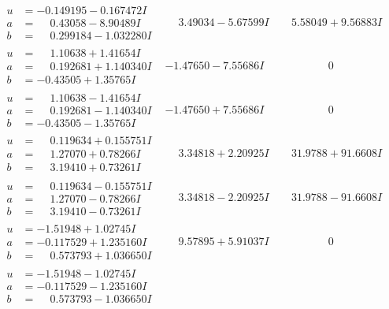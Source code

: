 \documentclass[1p]{elsarticle_modified}
\theoremstyle{definition}
\begin{document}
$$\begin{array}{c|c|c}
\begin{aligned}
u &= -0.149195 - 0.167472 I \\
a &= \phantom{-}0.43058 - 8.90489 I \\
b &= \phantom{-}0.299184 - 1.032280 I\end{aligned}
 & \phantom{-}3.49034 - 5.67599 I & \phantom{-}5.58049 + 9.56883 I \\ \hline\begin{aligned}
u &= \phantom{-}1.10638 + 1.41654 I \\
a &= \phantom{-}0.192681 + 1.140340 I \\
b &= -0.43505 + 1.35765 I\end{aligned}
 & -1.47650 - 7.55686 I & \phantom{-0.000000 } 0 \\ \hline\begin{aligned}
u &= \phantom{-}1.10638 - 1.41654 I \\
a &= \phantom{-}0.192681 - 1.140340 I \\
b &= -0.43505 - 1.35765 I\end{aligned}
 & -1.47650 + 7.55686 I & \phantom{-0.000000 } 0 \\ \hline\begin{aligned}
u &= \phantom{-}0.119634 + 0.155751 I \\
a &= \phantom{-}1.27070 + 0.78266 I \\
b &= \phantom{-}3.19410 + 0.73261 I\end{aligned}
 & \phantom{-}3.34818 + 2.20925 I & \phantom{-}31.9788 + 91.6608 I \\ \hline\begin{aligned}
u &= \phantom{-}0.119634 - 0.155751 I \\
a &= \phantom{-}1.27070 - 0.78266 I \\
b &= \phantom{-}3.19410 - 0.73261 I\end{aligned}
 & \phantom{-}3.34818 - 2.20925 I & \phantom{-}31.9788 - 91.6608 I \\ \hline\begin{aligned}
u &= -1.51948 + 1.02745 I \\
a &= -0.117529 + 1.235160 I \\
b &= \phantom{-}0.573793 + 1.036650 I\end{aligned}
 & \phantom{-}9.57895 + 5.91037 I & \phantom{-0.000000 } 0 \\ \hline\begin{aligned}
u &= -1.51948 - 1.02745 I \\
a &= -0.117529 - 1.235160 I \\
b &= \phantom{-}0.573793 - 1.036650 I\end{aligned}

\end{array}$$
\end{document}
